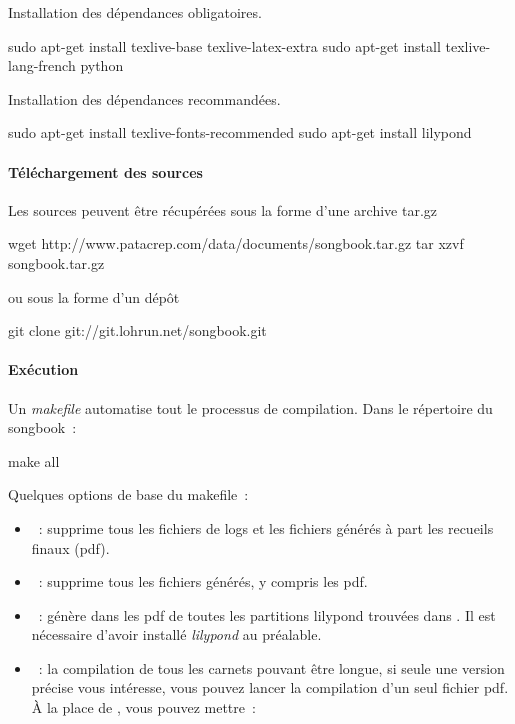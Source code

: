 Installation des dépendances obligatoires.
\begin{unix}
  sudo apt-get install texlive-base texlive-latex-extra
  sudo apt-get install texlive-lang-french python
\end{unix}

Installation des dépendances recommandées.
\begin{unix}
  sudo apt-get install texlive-fonts-recommended
  sudo apt-get install lilypond
\end{unix}

\paragraph{Téléchargement des sources}

Les sources peuvent être récupérées sous la forme d'une archive tar.gz
\begin{unix}
  wget http://www.patacrep.com/data/documents/songbook.tar.gz
  tar xzvf songbook.tar.gz
\end{unix}

ou sous la forme d'un dépôt \git

\begin{unix}
  git clone git://git.lohrun.net/songbook.git
\end{unix}

\paragraph{Exécution}

Un \emph{makefile} automatise tout le processus de compilation. 
Dans le répertoire du songbook~:

\begin{unix}
  make all
\end{unix}

Quelques options de base du makefile~:
\begin{itemize}
\item {}~: supprime tous les fichiers de logs et
  les fichiers générés à part les recueils finaux (pdf).
\item {}~: supprime tous les fichiers générés,
  y compris les pdf.
\item {}~: génère dans  les
  pdf de toutes les partitions lilypond  trouvées dans
  . Il est nécessaire d'avoir installé
  \emph{lilypond} au préalable.
\item {}~: la compilation de tous les carnets
  pouvant être longue, si seule une version précise vous intéresse,
  vous pouvez lancer la compilation d'un seul fichier pdf. À la place
  de , vous pouvez mettre~:
\end{itemize}

